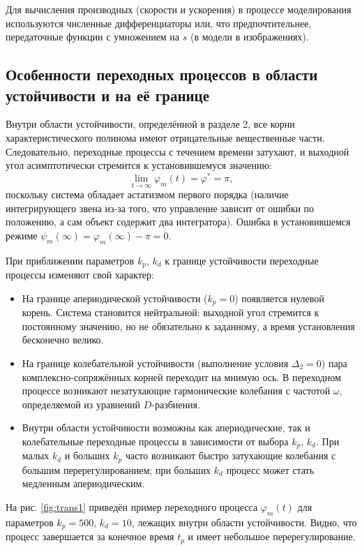 \documentclass[a4paper, 14pt]{extarticle}
\begin{document}
    Для вычисления производных (скорости и ускорения) в процессе моделирования используются численные дифференциаторы или, что предпочтительнее, передаточные функции с умножением на $s$ (в модели в изображениях).

    \subsection{Особенности переходных процессов в области устойчивости и на её границе}
    Внутри области устойчивости, определённой в разделе 2, все корни характеристического полинома имеют отрицательные вещественные части. Следовательно, переходные процессы с течением времени затухают, и выходной угол асимптотически стремится к установившемуся значению:
    \[
    \lim_{t\to\infty} \varphi_m(t) = \varphi^* = \pi,
    \]
    поскольку система обладает астатизмом первого порядка (наличие интегрирующего звена из-за того, что управление зависит от ошибки по положению, а сам объект содержит два интегратора). Ошибка в установившемся режиме $\psi_m(\infty) = \varphi_m(\infty) - \pi = 0$.

    При приближении параметров $k_p$, $k_d$ к границе устойчивости переходные процессы изменяют свой характер:
    \begin{itemize}
    \item На границе апериодической устойчивости ($k_p = 0$) появляется нулевой корень. Система становится нейтральной: выходной угол стремится к постоянному значению, но не обязательно к заданному, а время установления бесконечно велико.
    \item На границе колебательной устойчивости (выполнение условия $\Delta_2 = 0$) пара комплексно-сопряжённых корней переходит на мнимую ось. В переходном процессе возникают незатухающие гармонические колебания с частотой $\omega$, определяемой из уравнений $D$-разбиения.
    \item Внутри области устойчивости возможны как апериодические, так и колебательные переходные процессы в зависимости от выбора $k_p$, $k_d$. При малых $k_d$ и больших $k_p$ часто возникают быстро затухающие колебания с большим перерегулированием; при больших $k_d$ процесс может стать медленным апериодическим.
    \end{itemize}

    На рис. \ref{fig:trans1} приведён пример переходного процесса $\varphi_m(t)$ для параметров $k_p=500$, $k_d=10$, лежащих внутри области устойчивости. Видно, что процесс завершается за конечное время $t_p$ и имеет небольшое перерегулирование.
\end{document}
